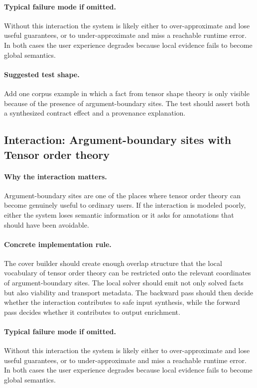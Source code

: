 \documentclass[11pt]{report}
\theoremstyle{definition}
\theoremstyle{plain}
\begin{document}
\paragraph{Typical failure mode if omitted.}
Without this interaction the system is likely either to over-approximate and
lose useful guarantees, or to under-approximate and miss a reachable runtime
error. In both cases the user experience degrades because local evidence
fails to become global semantics.

\paragraph{Suggested test shape.}
Add one corpus example in which a fact from tensor shape theory is only
visible because of the presence of argument-boundary sites. The test should
assert both a synthesized contract effect and a provenance explanation.

\subsection{Interaction: Argument-boundary sites with Tensor order theory}

\paragraph{Why the interaction matters.}
Argument-boundary sites are one of the places where tensor order theory can become
genuinely useful to ordinary users. If the interaction is modeled poorly,
either the system loses semantic information or it asks for annotations that
should have been avoidable.

\paragraph{Concrete implementation rule.}
The cover builder should create enough overlap structure that the local
vocabulary of tensor order theory can be restricted onto the relevant
coordinates of argument-boundary sites. The local solver should emit not only
solved facts but also viability and transport metadata. The backward pass
should then decide whether the interaction contributes to safe input
synthesis, while the forward pass decides whether it contributes to output
enrichment.

\paragraph{Typical failure mode if omitted.}
Without this interaction the system is likely either to over-approximate and
lose useful guarantees, or to under-approximate and miss a reachable runtime
error. In both cases the user experience degrades because local evidence
fails to become global semantics.
\end{document}
